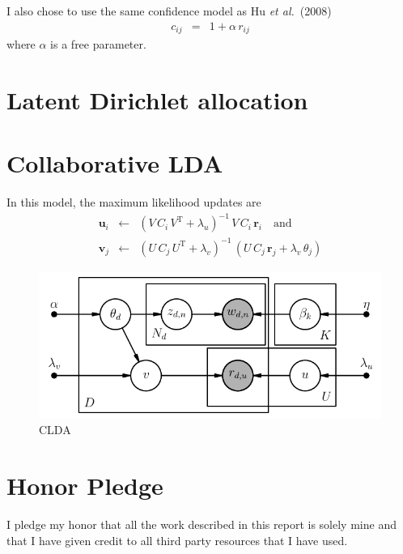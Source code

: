 \documentclass[11pt]{article}
\newcommand{\figlabel}[1]{\label{fig:#1}}
\newcommand{\etal}{\emph{et al.}}
\begin{document}
I also chose to use the same confidence model as Hu \etal~(2008)
\begin{eqnarray}
c_{ij} &=& 1+\alpha\,r_{ij}
\end{eqnarray}
where $\alpha$ is a free parameter.

\section{Latent Dirichlet allocation}

\section{Collaborative LDA}

In this model, the maximum likelihood updates are \cite{ctr}
\begin{eqnarray}
\mathbf{u}_i &\gets& (V\,C_i\,V^\mathrm{T}+\lambda_u)^{-1}\,
                     V\,C_i\,\mathbf{r}_i
\quad \mathrm{and} \\
\mathbf{v}_j &\gets& (U\,C_j\,U^\mathrm{T} + \lambda_v)^{-1}\,(U\,C_j\,
                     \mathbf{r}_j + \lambda_v\,\theta_j) \nonumber
\end{eqnarray}

\newpage
\begin{multicols}{2}
\begin{figure}
\centering
\includegraphics{clda.pdf}
\caption{%
CLDA
\figlabel{clda}}
\end{figure}
\end{multicols}

\newpage
\section{Honor Pledge}
I pledge my honor that all the work described in this report is solely mine
and that I have given credit to all third party resources that I have used.
\end{document}
